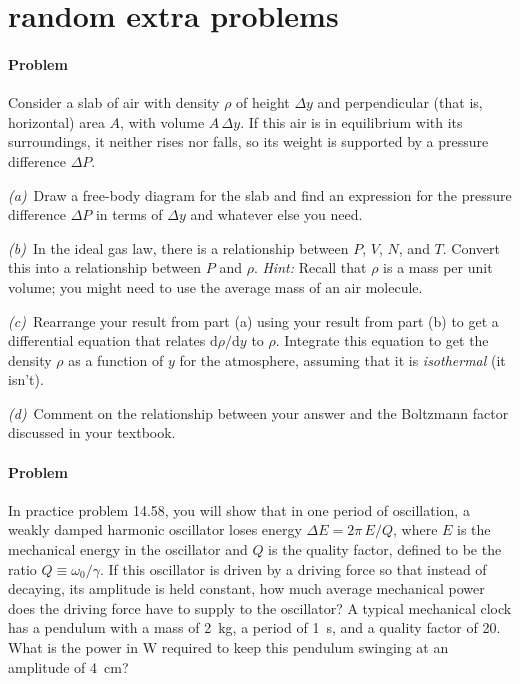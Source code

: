 \documentclass[12pt]{article}
\begin{document}
\thispagestyle{empty}

\section*{random extra problems}

\paragraph{Problem~\theproblem}%
Consider a slab of air with density $\rho$ of height $\Delta y$ and
perpendicular (that is, horizontal) area $A$, with volume $A\,\Delta
y$.  If this air is in equilibrium with its surroundings, it neither
rises nor falls, so its weight is supported by a pressure difference
$\Delta P$.

\textsl{(a)}~Draw a free-body diagram for the slab and find an
expression for the pressure difference $\Delta P$ in terms of $\Delta
y$ and whatever else you need.

\textsl{(b)}~In the ideal gas law, there is a relationship between
$P$, $V$, $N$, and $T$.  Convert this into a relationship between $P$
and $\rho$.  \emph{Hint:} Recall that $\rho$ is a mass per unit
volume; you might need to use the average mass of an air molecule.

\textsl{(c)}~Rearrange your result from part (a) using your result
from part (b) to get a differential equation that relates
$\mathrm{d}\rho/\mathrm{d}y$ to $\rho$.  Integrate this equation to
get the density $\rho$ as a function of $y$ for the atmosphere,
assuming that it is \emph{isothermal} (it isn't).

\textsl{(d)}~Comment on the relationship between your answer and the
Boltzmann factor discussed in your textbook.

\paragraph{Problem~\theproblem}%
In practice problem 14.58, you will show that in one period of
oscillation, a weakly damped harmonic oscillator loses energy $\Delta
E = 2\pi\,E/Q$, where $E$ is the mechanical energy in the oscillator
and $Q$ is the quality factor, defined to be the ratio
$Q\equiv\omega_0/\gamma$.  If this oscillator is driven by a driving
force so that instead of decaying, its amplitude is held constant, how
much average mechanical power does the driving force have to supply to
the oscillator?  A typical mechanical clock has a pendulum with a mass
of 2~kg, a period of 1~s, and a quality factor of 20.  What is the
power in W required to keep this pendulum swinging at an amplitude of
4~cm?
\end{document}
